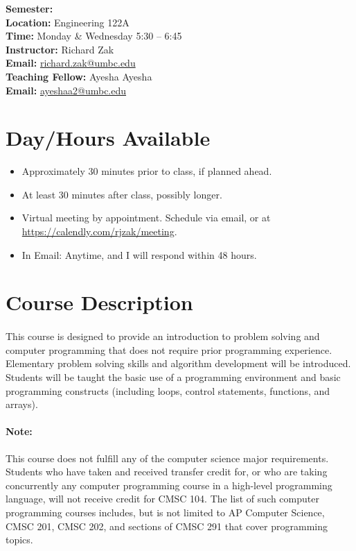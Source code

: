 \documentclass[letter,10pt]{article}
\begin{document}
\textbf{Semester:} \\
\textbf{Location:} Engineering 122A \\
\textbf{Time:} Monday \& Wednesday 5:30 -- 6:45 \\
\textbf{Instructor:} Richard Zak \\
\textbf{Email:} \href{mailto:richard.zak@umbc.edu?Subject=CMSC104}{richard.zak@umbc.edu} \\
\textbf{Teaching Fellow:} Ayesha Ayesha \\
\textbf{Email:} \href{mailto:ayeshaa2@umbc.edu?Subject=CMSC104}{ayeshaa2@umbc.edu}

\section*{Day/Hours Available}
\begin{itemize}
\item Approximately 30 minutes prior to class, if planned ahead.
\item At least 30 minutes after class, possibly longer.
\item Virtual meeting by appointment. Schedule via email, or at \url{https://calendly.com/rjzak/meeting}.
\item In Email: Anytime, and I will respond within 48 hours.
\end{itemize}

\section*{Course Description}
\paragraph{}This course is designed to provide an introduction to problem solving and computer programming that does not require prior programming experience. Elementary problem solving skills and algorithm development will be introduced. Students will be taught the basic use of a programming environment and basic programming constructs (including loops, control statements, functions, and arrays).

\paragraph{Note:}This course does not fulfill any of the computer science major requirements. Students who have taken and received transfer credit for, or who are taking concurrently any computer programming course in a high-level programming language, will not receive credit for CMSC 104. The list of such computer programming courses includes, but is not limited to AP Computer Science, CMSC 201, CMSC 202, and sections of CMSC 291 that cover programming topics.
\end{document}
